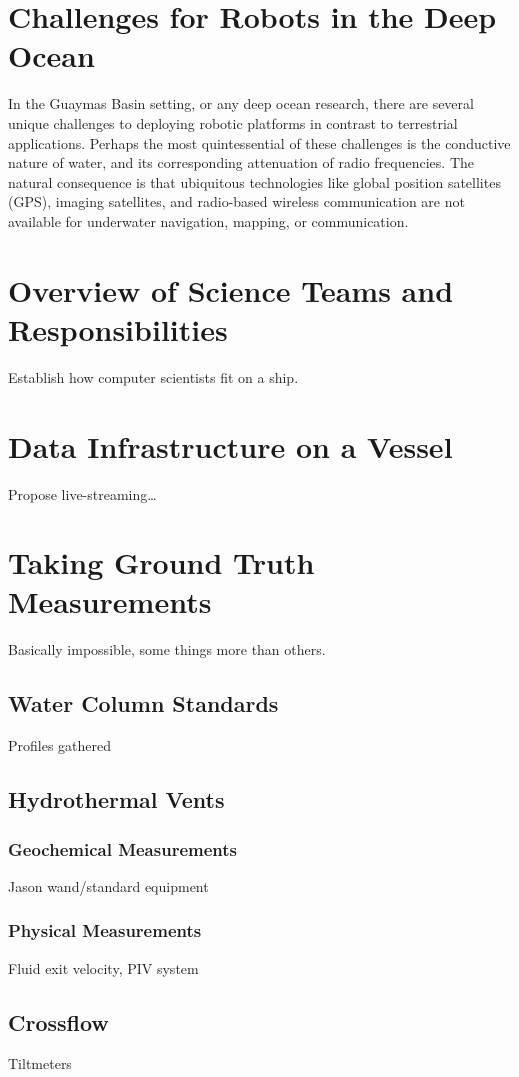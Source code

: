 \section{Challenges for Robots in the Deep Ocean}
\label{sec:ops_challenges}
In the Guaymas Basin setting, or any deep ocean research, there are several unique challenges to deploying robotic platforms in contrast to terrestrial applications. Perhaps the most quintessential of these challenges is the conductive nature of water, and its corresponding attenuation of radio frequencies\autocite{qureshi2016rf}. The natural consequence is that ubiquitous technologies like global position satellites (GPS), imaging satellites, and radio-based wireless communication are not available for underwater navigation, mapping, or communication. 

\section{Overview of Science Teams and Responsibilities}
Establish how computer scientists fit on a ship.

\section{Data Infrastructure on a Vessel}
Propose live-streaming\dots

\section{Taking Ground Truth Measurements}
Basically impossible, some things more than others.

\subsection{Water Column Standards}
Profiles gathered

\subsection{Hydrothermal Vents}

\subsubsection{Geochemical Measurements}
Jason wand/standard equipment

\subsubsection{Physical Measurements}
Fluid exit velocity, PIV system

\subsection{Crossflow}
Tiltmeters

